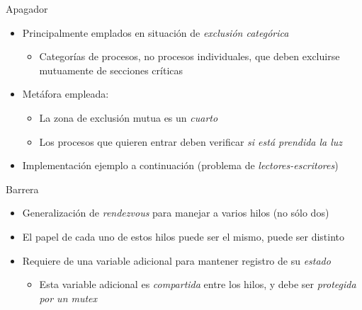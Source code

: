 \documentclass[presentation]{beamer}
\begin{document}
\begin{frame}[label={sec:org785e8fc}]{Apagador}
\begin{itemize}
\item Principalmente emplados en situación de \emph{exclusión categórica}
\begin{itemize}
\item Categorías de procesos, no procesos individuales, que deben
excluirse mutuamente de secciones críticas
\end{itemize}
\item Metáfora empleada:
\begin{itemize}
\item La zona de exclusión mutua es un \emph{cuarto}
\item Los procesos que quieren entrar deben verificar \emph{si está prendida
la luz}
\end{itemize}
\item Implementación ejemplo a continuación (problema de
\emph{lectores-escritores})
\end{itemize}
\end{frame}
\begin{frame}[label={sec:org1f75b0f}]{Barrera}
\begin{itemize}
\item Generalización de \emph{rendezvous} para manejar a varios hilos (no sólo
dos)
\item El papel de cada uno de estos hilos puede ser el mismo, puede ser
distinto
\item Requiere de una variable adicional para mantener registro de su
\emph{estado}
\begin{itemize}
\item Esta variable adicional es \emph{compartida} entre los hilos, y debe
ser \emph{protegida por un mutex}
\end{itemize}
\end{itemize}
\end{frame}
\end{document}
